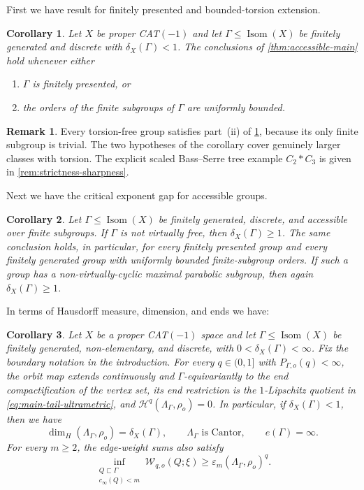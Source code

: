 \documentclass[11pt]{article}
\newtheorem{corollary}[corollary]{Corollary}
\theoremstyle{definition}
\newtheorem*{remark*}{Remark}
\newcommand{\Isom}{\operatorname{Isom}}
\newcommand{\EdgeSum}{\mathcal W}
\begin{document}
First we have result for finitely presented and bounded-torsion extension.
\begin{corollary}
\label{cor:accessibility-extension}
Let $X$ be proper CAT$(-1)$ and let $\Gamma\le\Isom(X)$ be finitely generated and discrete
with $\delta_X(\Gamma)<1$.  The conclusions of
\cref{thm:accessible-main} hold whenever either
\begin{enumerate}[label=\textup{(\roman*)}]
\item $\Gamma$ is finitely presented, or
\item the orders of the finite subgroups of $\Gamma$ are uniformly bounded.
\end{enumerate}
\end{corollary}

\begin{remark*}
Every torsion-free group satisfies part~\textup{(ii)} of
\cref{cor:accessibility-extension}, because its only finite subgroup is trivial.  
The two hypotheses of the corollary cover genuinely larger classes with torsion. The explicit
scaled Bass--Serre tree example $C_2*C_3$ is given in
\cref{rem:strictness-sharpness}.
\end{remark*}
Next we have the critical exponent gap for accessible groups.
\begin{corollary}
\label{cor:accessible-gap}
Let $\Gamma\le\Isom(X)$ be finitely generated, discrete, and accessible over finite subgroups.
If $\Gamma$ is not virtually free, then $\delta_X(\Gamma)\ge1$.  The same conclusion holds,
in particular, for every finitely presented group and every finitely generated group with
uniformly bounded finite-subgroup orders.  If such a group has a non-virtually-cyclic maximal
parabolic subgroup, then again $\delta_X(\Gamma)\ge1$.
\end{corollary}
In terms of Hausdorff measure, dimension, and ends we have:
\begin{corollary}
\label{cor:boundary-dimension-ends}
Let $X$ be a proper CAT$(-1)$ space and let $\Gamma\le\Isom(X)$ be finitely generated,
non-elementary, and discrete, with $0<\delta_X(\Gamma)<\infty$.  Fix the boundary notation in the introduction.
For every $q\in(0,1]$ with $P_{\Gamma,o}(q)<\infty$, the orbit map extends
continuously and $\Gamma$-equivariantly to the end compactification of the vertex set, its end
restriction is the $1$-Lipschitz quotient in \eqref{eq:main-tail-ultrametric}, and
$\mathcal H^q(\Lambda_\Gamma,\rho_o)=0$.  In particular, if
$\delta_X(\Gamma)<1$, then we have
\begin{equation}\label{eq:full-limit-dimension}
 \dim_H(\Lambda_\Gamma,\rho_o)=\delta_X(\Gamma),\qquad
 \Lambda_\Gamma\text{ is Cantor},\qquad e(\Gamma)=\infty.
\end{equation}
For every $m\ge2$, the edge-weight sums also satisfy
\begin{equation}\label{eq:main-edge-sum-bound}
 \inf_{\substack{Q\sqsubset\Gamma\\c_\infty(Q)<m}}
 \EdgeSum_{q,o}(Q;\xi)\ge\varepsilon_m(\Lambda_\Gamma,\rho_o)^q.
\end{equation}
\end{corollary}
\end{document}
